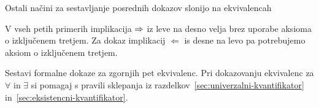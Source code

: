 Ostali načini za sestavljanje posrednih dokazov slonijo na
ekvivalencah
%
%
V vseh petih primerih implikacija $\Rightarrow$ iz leve na desno velja brez
uporabe aksioma o izključenem tretjem. Za dokaz implikacij
$\Leftarrow$ is desne na levo pa potrebujemo aksiom o izključenem
tretjem.

\begin{naloga}
  Sestavi formalne dokaze za zgornjih pet ekvivalenc. Pri dokazovanju
  ekvivalenc za $\forall$ in $\exists$ si pomagaj s pravili sklepanja
  iz razdelkov~\ref{sec:univerzalni-kvantifikator}
  in~\ref{sec:eksistencni-kvantifikator}.
\end{naloga}

